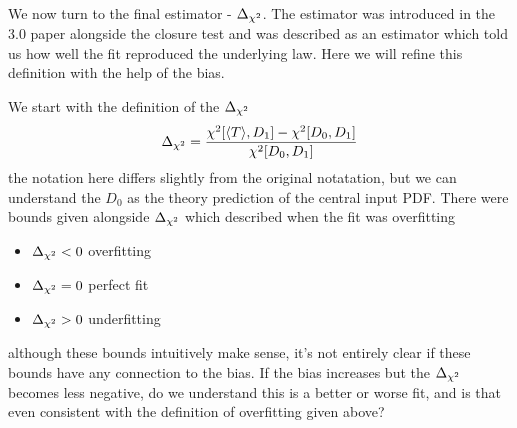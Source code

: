 We now turn to the final estimator - $\Delta_{\chi^{2}}$. The estimator was introduced in the
3.0 paper alongside the closure test and was described as an estimator which told
us how well the fit reproduced the underlying law. Here we will refine this definition
with the help of the bias.

We start with the definition of the $\Delta_{\chi^{2}}$
%
\begin{equation}
    \Delta_{\chi^{2}} = \frac{\chi^{2}[\langle T \rangle, D_{1}] - \chi^{2}[D_{0}, D_{1}]}{\chi^{2}[D_{0}, D_{1}]}
\end{equation}
the notation here differs slightly from the original notatation, but we can understand
the $D_{0}$ as the theory prediction of the central input PDF. There were bounds given alongside
$\Delta_{\chi^{2}}$ which described when the fit was overfitting
%
\begin{itemize}
    \item $\Delta_{\chi^{2}} < 0$ overfitting
    \item $\Delta_{\chi^{2}} = 0$ perfect fit
    \item $\Delta_{\chi^{2}} > 0$ underfitting 
\end{itemize}
%
although these bounds intuitively make sense, it's not entirely clear if these
bounds have any connection to the bias. If the bias increases but the $\Delta_{\chi^{2}}$ becomes
less negative, do we understand this is a better or worse fit, and is that even consistent
with the definition of overfitting given above?

